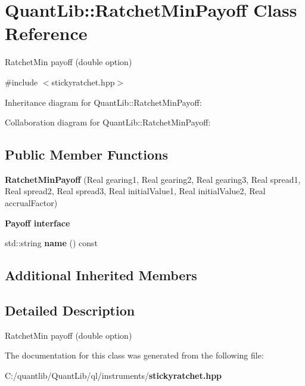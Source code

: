 \section{Quant\+Lib\+:\+:Ratchet\+Min\+Payoff Class Reference}
\label{class_quant_lib_1_1_ratchet_min_payoff}


Ratchet\+Min payoff (double option)  




{\ttfamily \#include $<$stickyratchet.\+hpp$>$}



Inheritance diagram for Quant\+Lib\+:\+:Ratchet\+Min\+Payoff\+:


Collaboration diagram for Quant\+Lib\+:\+:Ratchet\+Min\+Payoff\+:
\subsection*{Public Member Functions}
\begin{DoxyCompactItemize}
\item 
{\bfseries Ratchet\+Min\+Payoff} (Real gearing1, Real gearing2, Real gearing3, Real spread1, Real spread2, Real spread3, Real initial\+Value1, Real initial\+Value2, Real accrual\+Factor)\label{class_quant_lib_1_1_ratchet_min_payoff_a24cfd244d8361a0fe8ae65db9a89281a}

\end{DoxyCompactItemize}
\begin{Indent}{\bf Payoff interface}\par
\begin{DoxyCompactItemize}
\item 
std\+::string {\bfseries name} () const \label{class_quant_lib_1_1_ratchet_min_payoff_a1f93459589aa10e6f4d166a749659907}

\end{DoxyCompactItemize}
\end{Indent}
\subsection*{Additional Inherited Members}


\subsection{Detailed Description}
Ratchet\+Min payoff (double option) 

The documentation for this class was generated from the following file\+:\begin{DoxyCompactItemize}
\item 
C\+:/quantlib/\+Quant\+Lib/ql/instruments/{\bf stickyratchet.\+hpp}\end{DoxyCompactItemize}
